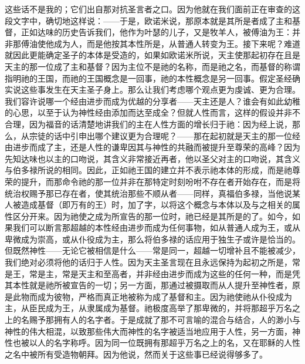 这些话不是我的；它们出自那对抗圣言者之口。因为他就在我们面前正在审查的这段文字中，确切地这样说：——于是，欧诺米说，那原本就是其所是者成了主和基督，正如达味的历史告诉我们，他作为叶瑟的儿子，又是牧羊人，被傅油为王：并非那傅油使他成为人，而是他按其本性所是，从普通人转变为王。接下来呢？难道就因此更能确定圣子的本体是受造的，如果如欧诺米所说，天主使那起初存在且是天主的那一位成了主和基督？因为主位不是祂的名称，而是祂之名，而基督的称谓指明祂的王国，而祂的王国概念是一回事，祂的本性概念是另一回事。假定圣经确实说这些事发生在天主圣子身上。那么让我们考虑哪个观点更为虔诚、更为合理。我们容许说哪一个经由进步而成为优越的分享者——天主还是人？谁会有如此幼稚的心思，以至于认为神性经由添加而达至成全？但就人性而言，这样的假设并非不合理，因为福音的话清楚地讲我们的主在人性方面的增长归于祂：因为经上说，那么，从宗徒的话中引申出哪个建议更为合理呢？——那在起初就是天主的那一位经由进步而成了主，还是人性的谦卑因其与神性的共融而被提升至尊荣的高峰？因为先知达味也以主的口吻说，其含义非常接近再者，他以圣父对主的口吻说，其含义与伯多禄所说的相同。因此，正如祂王国的建立并不表示祂本体的形成，而是祂尊荣的提升，而那命令祂的那一位并非在那特定时刻吩咐不存在者开始存在，而是将统治权赐予那已存在者，使其统治那些不顺从者——同样，真福伯多禄，当他说某人被造成基督（即万有的王）时，加了字，以将这个概念与本体以及与之相关的属性区分开来。因为祂使之成为所宣告的那一位时，祂已经是其所是的了。如今，如果我们可以断言那超越的本性经由进步而成为任何事物，如从普通人成为王，或从卑微成为崇高，或从仆役成为主，那么将伯多禄的话应用于独生子或许是恰当的。但既然神性——无论它被相信是什么——常是同一，超越一切增补且不能被减少，我们绝对必须将他的话归于人性。因为天主圣言现在且永远保持为起初之所是，常是王，常是主，常是天主和至高者，并非经由进步而成为这些的任何一种，而是凭其本性就是祂所被宣告的一切；另一方面，那通过被摄取而从人提升至神性者，原是此物而成为彼物，严格而真正地被称为成了基督和主。因为祂使祂从仆役成为主，从臣民成为王，从隶属成为基督。祂极度高举了那卑微的，并将那超乎万名之上的名赐予那拥有人的名字者。于是成就了那不可言喻的混合与结合，人的渺小与神性的伟大相混，以致那些伟大而神性的名字被适当地应用于人性，另一方面，神性也被以人的名字称呼。因为同一位既拥有那超乎万名之上的名，又在耶稣的人性之名中被所有受造物朝拜。因为他说，然而关于这些事已经说得够多了。\par

